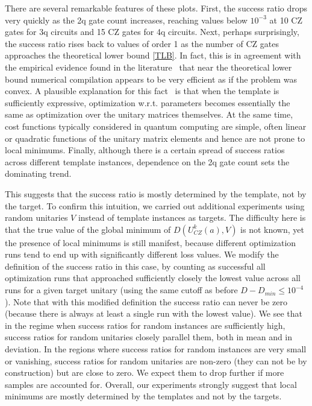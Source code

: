 \documentclass[twocolumn, amsfonts, amssymb, aps, nofootinbib]{revtex4-2}
\newcommand{\CZ}{\textsf{CZ }}
\begin{document}
There are several remarkable features of these plots. First, the success ratio drops very quickly as the 2q gate count increases, reaching values below $10^{-3}$ at 10 \CZ gates for 3q circuits and 15 \CZ gates for 4q circuits. Next, perhaps surprisingly, the success ratio rises back to values of order 1 as the number of \CZ gates approaches the theoretical lower bound \eqref{TLB}. In fact, this is in agreement with the empirical evidence found in the literature~\cite{Madden2021, Rakyta2021, Kiani2020} that near the theoretical lower bound numerical compilation appears to be very efficient as if the problem was convex. A plausible explanation for this fact~\cite{Ge2022} is that when the template is sufficiently expressive, optimization w.r.t. parameters becomes essentially the same as optimization over the unitary matrices themselves. At the same time, cost functions typically considered in quantum computing are simple, often linear or quadratic functions of the unitary matrix elements and hence are not prone to local minimums. Finally, although there is a certain spread of success ratios across different template instances, dependence on the 2q gate count sets the dominating trend.

This suggests that the success ratio is mostly determined by the template, not by the target. To confirm this  intuition,  we carried out additional experiments using random unitaries $V$ instead of template instances as targets. The difficulty here is that the true value of the global minimum of $D(U^k_{CZ}(a), V)$ is not known, yet the presence of local minimums is still manifest, because different optimization runs tend to end up with significantly different loss values. We modify the definition of the success ratio in this case, by counting as successful all optimization runs that approached sufficiently closely the lowest value across all runs for a given target unitary (using the same cutoff as before $D-D_{min}\le 10^{-4}$). Note that with this modified definition the success ratio can never be zero (because there is always at least a single run with the lowest value). We see that in the regime when success ratios for random instances are sufficiently high, success ratios for random unitaries closely parallel them, both in mean and in deviation. In the regions where success ratios for random instances are very small or vanishing, success ratios for random unitaries are non-zero (they can not be by construction) but are close to zero. We expect them to drop further if more samples are accounted for. Overall, our experiments strongly suggest that local minimums are mostly determined by the templates and not by the targets.
\end{document}
